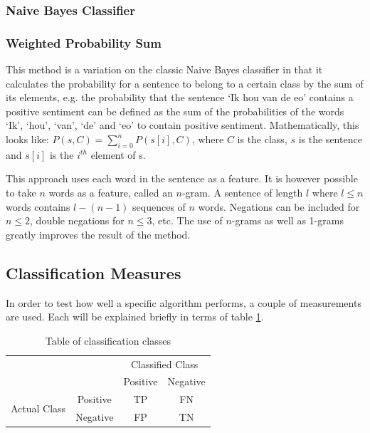 \documentclass[11pt]{article}
\begin{document}
\subsubsection{Naive Bayes Classifier}

\subsubsection{Weighted Probability Sum}
This method is a variation on the classic Naive Bayes classifier in that it calculates the probability for a sentence to belong to a certain class by the sum of its elements, e.g. the probability that the sentence `Ik hou van de eo' contains a positive sentiment can be defined as the sum of the probabilities of the words `Ik', `hou', `van', `de' and `eo' to contain positive sentiment. Mathematically, this looks like:
$\displaystyle P(s, C) = \sum_{i=0}^n P( s[i], C )$, where $C$ is the class, $s $ is the sentence and $s[i]$ is the $i^{th}$ element of s. 

This approach uses each word in the sentence as a feature. It is however possible to take $n$ words as a feature, called an $n$-gram. A sentence of length $l$ where $l \leq n$ words contains $l - (n-1)$ sequences of $n$ words. Negations can be included for $n \leq 2$, double negations for $n \leq 3$, etc. The use of $n$-grams as well as 1-grams greatly improves the result of the method. 

\subsection{Classification Measures}

In order to test how well a specific algorithm performs, a couple of measurements are used. Each will be explained briefly in terms of table \ref{classification}.

\begin{table}[h]
\center
\begin{tabular}{cc|c|c|}
\cline{3-4}
& & \multicolumn{2}{|c|}{Classified Class} \\ \cline{3-4}
& &  Positive & Negative \\ \cline{1-4}
\multicolumn{1}{|c|}{\multirow{2}{*}{Actual Class}} &
\multicolumn{1}{|c|}{Positive} &  TP & FN      \\ \cline{2-4}
\multicolumn{1}{|c|}{}                        &
\multicolumn{1}{|c|}{Negative} & FP & TN     \\ \cline{1-4}
\end{tabular}
\caption{Table of classification classes}
\label{classification}
\end{table} 
\end{document}
